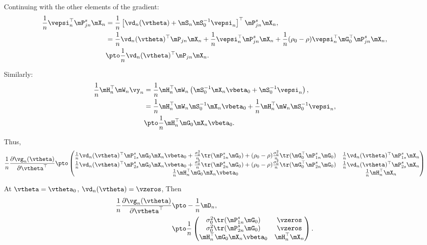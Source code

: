 Continuing with the other elements of the gradient:
\begin{equation*}
  \begin{aligned}
    \frac{1}{n}\vepsi_n^\top\mP_{jn}^s\mX_n & = \frac{1}{n}\left[\vd_n(\vtheta)+ \mS_n\mS_0^{-1}\vepsi_n\right]^\top\mP_{jn}^s\mX_n, \\
    & = \frac{1}{n}\vd_n(\vtheta)^\top\mP_{jn}\mX_n  + \frac{1}{n}\vepsi_n^\top\mP_{jn}^s\mX_n + \frac{1}{n}(\rho_0 - \rho)\vepsi_n^\top\mG_0^\top\mP^s_{jn}\mX_n, \\
    & \pto  \frac{1}{n}\vd_n(\vtheta)^\top\mP_{jn}\mX_n.
  \end{aligned}
\end{equation*}

Similarly:
\begin{equation*}
  \begin{aligned}
    \frac{1}{n}\mH_n^\top\mW_n\vy_n &  = \frac{1}{n}\mH_n^\top\mW_n\left(\mS_0^{-1}\mX_n\vbeta_0 + \mS_0^{-1}\vepsi_n\right), \\
    & = \frac{1}{n}\mH_n^\top\mW_n\mS_0^{-1}\mX_n\vbeta_0 +  \frac{1}{n}\mH_n^\top\mW_n\mS_0^{-1}\vepsi_n, \\
    & \pto \frac{1}{n}\mH_n^\top\mG_0\mX_n\vbeta_0.
  \end{aligned}
\end{equation*}

Thus, 
\begin{equation*}
  \frac{1}{n}\frac{\partial \vg_n(\vtheta)}{\partial \vtheta^\top} \pto 
  \begin{pmatrix}
    \frac{1}{n}\vd_n(\vtheta)^\top\mP_{1s}^s\mG_0\mX_n\vbeta_0 + \frac{\sigma_0^2}{n}\tr(\mP_{1n}^s\mG_0) + (\rho_0 - \rho)\frac{\sigma_0^2}{n}\tr(\mG_0^\top\mP_{1n}^s\mG_0) & \frac{1}{n}\vd_n(\vtheta)^\top\mP_{1s}^s\mX_n \\
        \frac{1}{n}\vd_n(\vtheta)^\top\mP_{2s}^s\mG_0\mX_n\vbeta_0 + \frac{\sigma_0^2}{n}\tr(\mP_{2n}^s\mG_0) + (\rho_0 - \rho)\frac{\sigma_0^2}{n}\tr(\mG_0^\top\mP_{2n}^s\mG_0) & \frac{1}{n}\vd_n(\vtheta)^\top\mP_{2s}^s\mX_n \\
      \frac{1}{n}\mH_n^\top\mG_0\mX_n\vbeta_0 & \frac{1}{n}\mH_n^\top\mX_n  
  \end{pmatrix}
\end{equation*}

At $\vtheta = \vtheta_0$, $\vd_n(\vtheta) = \vzeros$, Then
\begin{equation*}
\begin{aligned}
  \frac{1}{n}\frac{\partial \vg_n(\vtheta)}{\partial \vtheta^\top} & \pto  -\frac{1}{n}\mD_n, \\
  &\pto \frac{1}{n}\begin{pmatrix}
  \sigma_0^2\tr(\mP_{1n}^s\mG_0) & \vzeros \\
   \sigma_0^2\tr(\mP_{2n}^s\mG_0)  & \vzeros \\
      \mH_n^\top\mG_0\mX_n\vbeta_0 & \mH_n^\top\mX_n  
  \end{pmatrix}.
        \end{aligned}
\end{equation*}
  
